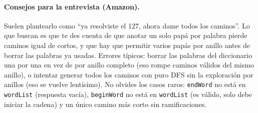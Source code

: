 \paragraph{Consejos para la entrevista (Amazon).} Suelen plantearlo como ``ya
resolviste el 127, ahora dame todos los caminos''. Lo que buscan es que te des
cuenta de que anotar un solo papá por palabra pierde caminos igual de cortos, y
que hay que permitir varios papás por anillo antes de borrar las palabras ya
usadas. Errores típicos: borrar las palabras del diccionario una por una en vez
de por anillo completo (eso rompe caminos válidos del mismo anillo), o intentar
generar todos los caminos con puro DFS sin la exploración
por anillos (eso se vuelve lentísimo). No olvides los casos raros:
\texttt{endWord} no está en \texttt{wordList} (respuesta vacía),
\texttt{beginWord} no está en \texttt{wordList} (es válido, solo debe iniciar la
cadena) y un único camino más corto sin ramificaciones.
